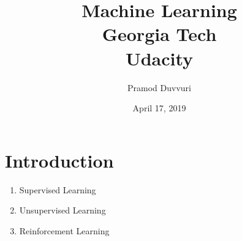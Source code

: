 \documentclass[11pt]{article}
\title{Machine Learning \\
	\large Georgia Tech \\
	Udacity}
\author{Pramod Duvvuri}
\date{April 17, 2019}
\begin{document}
	\maketitle
	\section*{Introduction}
	\begin{enumerate}
		\item Supervised Learning
		\item Unsupervised Learning
		\item Reinforcement Learning
	\end{enumerate}
\end{document}
